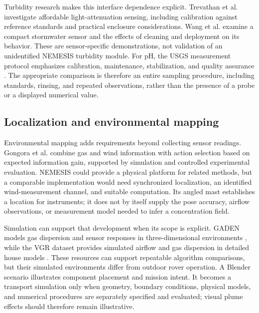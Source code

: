 \documentclass[11pt,a4paper]{article}
\begin{document}
Turbidity research makes this interface dependence explicit. Trevathan et al. \citep{trevathan2020_3d3a03} investigate affordable light-attenuation sensing, including calibration against reference standards and practical enclosure considerations. Wang et al. \citep{wang2024_112661} examine a compact stormwater sensor and the effects of cleaning and deployment on its behavior. These are sensor-specific demonstrations, not validation of an unidentified NEMESIS turbidity module. For pH, the USGS measurement protocol emphasizes calibration, maintenance, stabilization, and quality assurance \citep{usgs2021_e859f3}. The appropriate comparison is therefore an entire sampling procedure, including standards, rinsing, and repeated observations, rather than the presence of a probe or a displayed numerical value.

\FloatBarrier

\subsection{Localization and environmental mapping}\label{sec:3.6}

Environmental mapping adds requirements beyond collecting sensor readings. Gongora et al. \citep{gongora2023_ca6a1d} combine gas and wind information with action selection based on expected information gain, supported by simulation and controlled experimental evaluation. NEMESIS could provide a physical platform for related methods, but a comparable implementation would need synchronized localization, an identified wind-measurement channel, and suitable computation. Its angled mast establishes a location for instruments; it does not by itself supply the pose accuracy, airflow observations, or measurement model needed to infer a concentration field.

Simulation can support that development when its scope is explicit. GADEN models gas dispersion and sensor responses in three-dimensional environments \citep{monroy2017_e93884}, while the VGR dataset provides simulated airflow and gas dispersion in detailed house models \citep{ojeda2023_b7b9b6}. These resources can support repeatable algorithm comparisons, but their simulated environments differ from outdoor rover operation. A Blender scenario illustrates component placement and mission intent. It becomes a transport simulation only when geometry, boundary conditions, physical models, and numerical procedures are separately specified and evaluated; visual plume effects should therefore remain illustrative.
\end{document}
